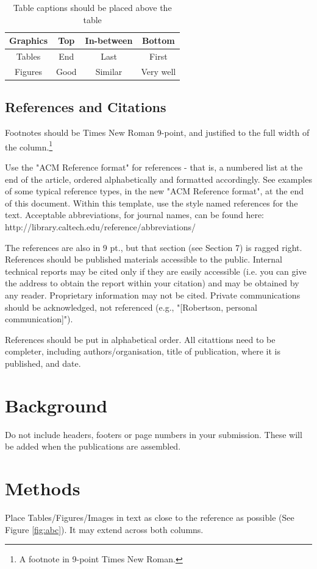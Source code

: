 \documentclass[acmtog, authorversion]{acmart}
\begin{document}
\begin{table}
\centering \caption{Table captions should be placed above the table}
\begin{tabular}{|c|c|c|c|} \hline
\textbf{Graphics} & \textbf{Top} & \textbf{In-between} & \textbf{Bottom}\\ \hline 
Tables&End&Last&First\\ \hline 
Figures&Good&Similar&Very well\\
\hline\end{tabular}
\end{table}

\subsection{References and Citations}
Footnotes should be Times New Roman 9-point, and justified to the 
full width of the column.\footnote{A footnote in 9-point Times New Roman.}

Use the "ACM Reference format" for references - that is, a numbered 
list at the end of the article, ordered alphabetically and formatted 
accordingly. See examples of some typical reference types, in the new 
"ACM Reference format", at the end of this document. Within this 
template, use the style named references for the text. Acceptable 
abbreviations, for journal names, can be found here: 
http://library.caltech.edu/reference/abbreviations/

The references are also in 9 pt., but that section (see Section 7) is 
ragged right. References should be published materials accessible to 
the public. Internal technical reports may be cited only if they are 
easily accessible (i.e. you can give the address to obtain the report 
within your citation) and may be obtained by any reader. Proprietary
information may not be cited. Private communications should be 
acknowledged, not referenced  (e.g., "[Robertson, personal communication]"). 

References should be put in alphabetical order. All citattions need to be completer, including authors/organisation, title of publication, where it is published, and date.

\section{Background}
Do not include headers, footers or page numbers in your submission. 
These will be added when the publications are assembled.

\section{Methods}
Place Tables/Figures/Images in text as close to the reference as possible 
(See Figure \ref{fig:abc}).  It may extend across both columns. 
\end{document}
